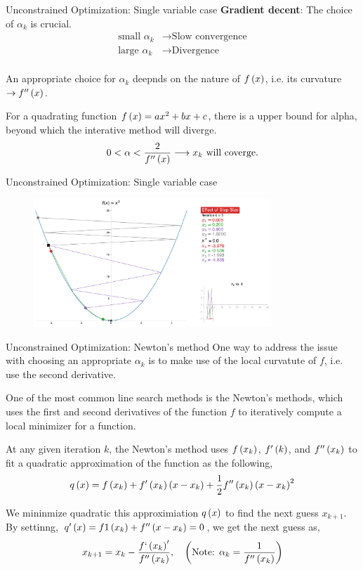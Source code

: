 \documentclass[aspectratio=169]{beamer}
\def\lp{\ensuremath\left(}
\def\rp{\ensuremath\right)}
\newcommand{\ct}[1]{\lp #1\rp}
\begin{document}
\begin{frame}{Unconstrained Optimization: Single variable case}
  \textbf{Gradient decent}: The choice of $\alpha_k$ is crucial.
  \[ 
    \begin{split} 
    \text{small } \alpha_k &\rightarrow \text{Slow convergence} \\
    \text{large } \alpha_k &\rightarrow \text{Divergence} \\
    \end{split}
  \]
  
  An appropriate choice for $\alpha_k$ deepnds on the nature of $f\ct{x}$, i.e. its curvature $\rightarrow f''\ct{x}$.
  \vspace{0.2cm}

  For a quadrating function $f\ct{x} = ax^2 + bx + c$, there is a upper bound for alpha, beyond which the interative method will diverge.
  \[ 0 < \alpha < \frac{2}{f''\ct{x}} \longrightarrow x_k \text{ will coverge.} \]
\end{frame}


\begin{frame}{Unconstrained Optimization: Single variable case}
  \begin{figure}
    \centering
    \includegraphics[width=0.8\textwidth]{figs/gd_stepsize.pdf}
  \end{figure}
\end{frame}


\begin{frame}{Unconstrained Optimization: Newton's method}
  One way to address the issue with choosing an appropriate $\alpha_k$ is to make use of the local curvatute of $f$, i.e. use the second derivative.
  \vspace{0.25cm}
  
  One of the most common line search methods is the Newton's methods, which uses the first and second derivatives of the function $f$ to iteratively compute a local minimizer for a function.
  \vspace{0.25cm}
  
  At any given iteration $k$, the Newton's method uses $f\ct{x_k}$, $f'\ct{k}$, and $f''\ct{x_k}$ to fit a quadratic approximation of the function as the following,
  \[ q\ct{x} = f\ct{x_k} + f'\ct{x_k}\ct{x - x_k} + \frac{1}{2}f''\ct{x_k}\ct{x - x_k}^2 \]

  We  mininmize quadratic this approximiation $q\ct{x}$ to find the next guess $x_{k+1}$. By settinng, $q'\ct{x} = f1\ct{x_k} + f''\ct{x - x_k} = 0$, we get the next guess as,
  \[ x_{k+1} = x_k - \frac{f`\ct{x_k}'}{f''\ct{x_k}}, \quad \ct{\text{Note: } \alpha_k = \frac{1}{f''\ct{x_k}}} \]
\end{frame}
\end{document}

